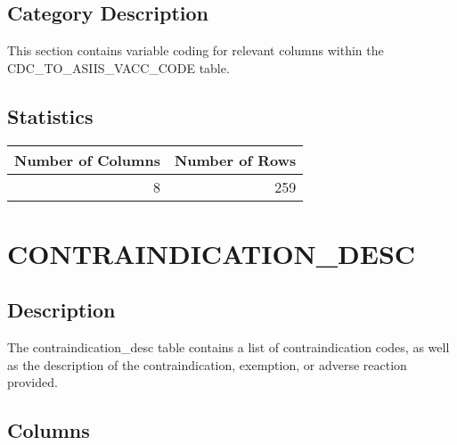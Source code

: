 \documentclass[
  letterpaper,
  DIV=11,
  numbers=noendperiod]{scrreprt}
\begin{document}
\hypertarget{category-description-3}{%
\section*{Category Description}\label{category-description-3}}

This section contains variable coding for relevant columns within the
CDC\_TO\_ASIIS\_VACC\_CODE table.

\hypertarget{statistics-3}{%
\section*{Statistics}\label{statistics-3}}

\begin{longtable}{rr}
\toprule
Number of Columns & Number of Rows \\ 
\midrule
8 & 259 \\ 
\bottomrule
\end{longtable}

\hypertarget{contraindication_desc}{%
\chapter*{CONTRAINDICATION\_DESC}\label{contraindication_desc}}

\hypertarget{description-4}{%
\section*{Description}\label{description-4}}

The contraindication\_desc table contains a list of contraindication
codes, as well as the description of the contraindication, exemption, or
adverse reaction provided.

\hypertarget{columns-4}{%
\section*{Columns}\label{columns-4}}
\end{document}
